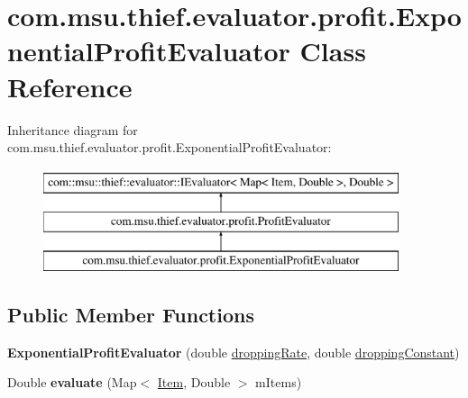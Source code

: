 \hypertarget{classcom_1_1msu_1_1thief_1_1evaluator_1_1profit_1_1ExponentialProfitEvaluator}{\section{com.\-msu.\-thief.\-evaluator.\-profit.\-Exponential\-Profit\-Evaluator Class Reference}
\label{classcom_1_1msu_1_1thief_1_1evaluator_1_1profit_1_1ExponentialProfitEvaluator}
}
Inheritance diagram for com.\-msu.\-thief.\-evaluator.\-profit.\-Exponential\-Profit\-Evaluator\-:\begin{figure}[H]
\begin{center}
\leavevmode
\includegraphics[height=3.000000cm]{classcom_1_1msu_1_1thief_1_1evaluator_1_1profit_1_1ExponentialProfitEvaluator}
\end{center}
\end{figure}
\subsection*{Public Member Functions}
\begin{DoxyCompactItemize}
\item 
\hypertarget{classcom_1_1msu_1_1thief_1_1evaluator_1_1profit_1_1ExponentialProfitEvaluator_a78cbc6e5d473b049534795b7fe154d31}{{\bfseries Exponential\-Profit\-Evaluator} (double \hyperlink{classcom_1_1msu_1_1thief_1_1evaluator_1_1profit_1_1ExponentialProfitEvaluator_a0bee5d7f079a9676692e3faa5f9d2da9}{dropping\-Rate}, double \hyperlink{classcom_1_1msu_1_1thief_1_1evaluator_1_1profit_1_1ExponentialProfitEvaluator_a75237d11c10af36c7f466e462d25d894}{dropping\-Constant})}\label{classcom_1_1msu_1_1thief_1_1evaluator_1_1profit_1_1ExponentialProfitEvaluator_a78cbc6e5d473b049534795b7fe154d31}

\item 
\hypertarget{classcom_1_1msu_1_1thief_1_1evaluator_1_1profit_1_1ExponentialProfitEvaluator_a5c38554b21eebe25127a9c79624db60b}{Double {\bfseries evaluate} (Map$<$ \hyperlink{classcom_1_1msu_1_1thief_1_1model_1_1Item}{Item}, Double $>$ m\-Items)}\label{classcom_1_1msu_1_1thief_1_1evaluator_1_1profit_1_1ExponentialProfitEvaluator_a5c38554b21eebe25127a9c79624db60b}

\end{DoxyCompactItemize}
